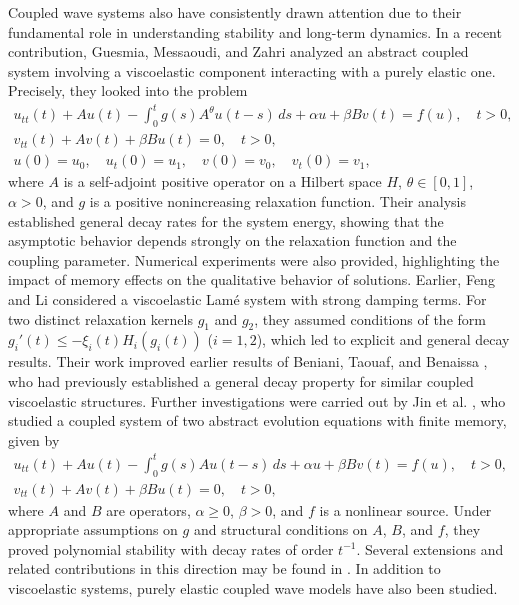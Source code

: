Coupled wave systems also have consistently drawn attention due to their fundamental role in understanding stability and long-term dynamics. In a recent contribution, Guesmia, Messaoudi, and Zahri \cite{GASM} analyzed an abstract coupled system involving a viscoelastic component interacting with a purely elastic one. Precisely, they looked into the problem
\begin{gather*}
u_{tt}(t) + Au(t) - \int_0^{t} g(s) A^{\theta} u(t - s) \, ds + \alpha u + \beta B v(t) = f(u), \quad t > 0, \\
v_{tt}(t) + A v(t) + \beta B u(t) = 0, \quad t > 0,\\
u(0) = u_0, \quad u_t(0) = u_1, \quad v(0) = v_0, \quad v_t(0) = v_1,
\end{gather*}
 where $A$ is a self-adjoint positive operator on a Hilbert space $H$, $\theta \in [0,1]$,
 $\alpha > 0$, and $g$ is a positive nonincreasing relaxation function.
 Their analysis established general decay rates for the system energy, showing that the
 asymptotic behavior depends strongly on the relaxation function and the coupling parameter.
 Numerical experiments were also provided, highlighting the impact of memory effects on
 the qualitative behavior of solutions. Earlier, Feng and Li \cite{FengBaoweiHaiyan} considered
 a viscoelastic Lam\'e system with strong damping terms. For two distinct relaxation kernels
 $g_1$ and $g_2$, they assumed conditions of the form $g_i'(t) \leq -\xi_i(t) H_i(g_i(t))$
 ($i=1,2$), which led to explicit and general decay results. Their work improved earlier results
 of Beniani, Taouaf, and Benaissa \cite{Beniani}, who had previously established a general
 decay property for similar coupled viscoelastic structures.
Further investigations were carried out by Jin et al. \cite{JKJT}, who studied a coupled system of two abstract evolution equations with finite memory, given by
\begin{gather*}
 u_{tt}(t) + Au(t) - \int_0^{t} g(s) A u(t - s) \, ds + \alpha u + \beta B v(t)
 = f(u), \quad t > 0, \\
v_{tt}(t) + A v(t) + \beta B u(t) = 0, \quad t > 0,
 \end{gather*}
 where $A$ and $B$ are operators, $\alpha \geq 0$, $\beta > 0$, and $f$ is a nonlinear source.
 Under appropriate assumptions on $g$ and structural conditions on $A$, $B$, and $f$,
 they proved polynomial stability with decay rates of order $t^{-1}$. Several extensions and
related contributions in this direction may be found in \cite{ ORHC, AkilM}.
In addition to viscoelastic systems, purely elastic coupled wave models have also been studied.
